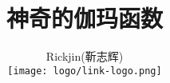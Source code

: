 %
\hypersetup{CJKbookmarks=true}
\title{\Huge \youyuan \textbf{神奇的伽玛函数}}
\author{\youyuan Rickjin(靳志辉) \\
\texttt{[image: logo/link-logo.png]}
}

\maketitle
\tableofcontents



